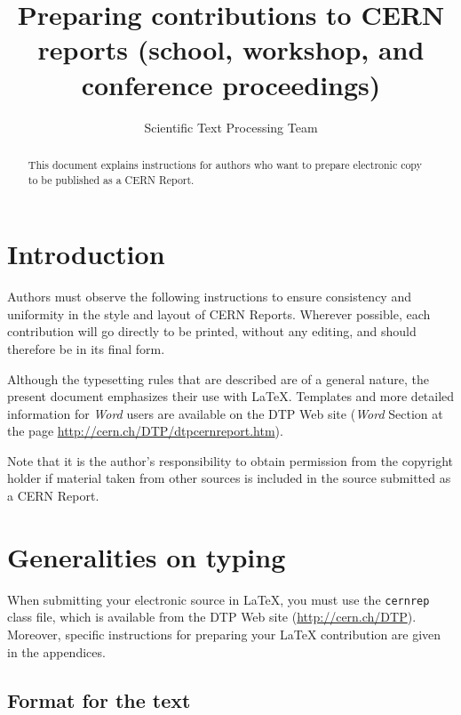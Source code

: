 \documentclass{cernyrep}
\begin{document}
\title{Preparing contributions to CERN reports (school, workshop, and
conference proceedings)}
 
\author{Scientific Text Processing Team}


\maketitle %

 
\begin{abstract}
This document explains instructions for authors who want to prepare
electronic copy to be published as a CERN Report.
\end{abstract}
 
\section{Introduction}
 
Authors must observe the following instructions to ensure consistency
and uniformity in the style and layout of CERN Reports.  Wherever
possible, each contribution will go directly to be printed, without
any editing, and should therefore be in its final form.

Although the typesetting rules that are described are of a general
nature, the present document emphasizes their use with
\LaTeX. Templates and more detailed information for \emph{Word} users
are available on the DTP Web site (\emph{Word} Section at the page
\url{http://cern.ch/DTP/dtpcernreport.htm}).
 
Note that it is the author's responsibility to obtain permission from
the copyright holder if material taken from other sources is included
in the source submitted as a CERN Report.

\section{Generalities on typing}

When submitting your electronic source in \LaTeX{}, you must use the
\texttt{cernrep} class file, which is available from the DTP Web site
(\url{http://cern.ch/DTP}). Moreover, specific instructions for preparing
your \LaTeX{} contribution are given in the appendices.

\subsection{Format for the text}
 
\end{document}
